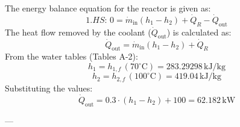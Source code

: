 The energy balance equation for the reactor is given as:  
\[
1. HS: \, 0 = \dot{m}_{\text{in}} (h_1 - h_2) + \dot{Q}_R - \dot{Q}_{\text{out}}
\]  
The heat flow removed by the coolant (\( \dot{Q}_{\text{out}} \)) is calculated as:  
\[
\dot{Q}_{\text{out}} = \dot{m}_{\text{in}} (h_1 - h_2) + \dot{Q}_R
\]  
From the water tables (Tables A-2):  
\[
h_1 = h_{1,f} \, (70^\circ\text{C}) = 283.29298 \, \text{kJ/kg}
\]  
\[
h_2 = h_{2,f} \, (100^\circ\text{C}) = 419.04 \, \text{kJ/kg}
\]  
Substituting the values:  
\[
\dot{Q}_{\text{out}} = 0.3 \cdot (h_1 - h_2) + 100 = 62.182 \, \text{kW}
\]  

---